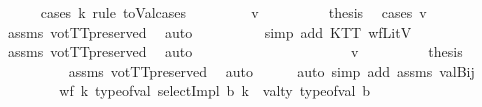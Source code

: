 \begin{isabellebody}
\ \ \ \ \isamarkupfalse%
\ {\isacharparenleft}{\kern0pt}cases\ k\ rule{\isacharcolon}{\kern0pt}\ toVal{}{}{}{}{\isachardot}{\kern0pt}cases{\isacharparenright}{\kern0pt}\isanewline
\ \ \ \ \ \ \isamarkupfalse%
\ {\isacharparenleft}{\kern0pt}{}\ v{\isacharparenright}{\kern0pt}\isanewline
\ \ \ \ \ \ \isamarkupfalse%
\ \isamarkupfalse%
\ {\isacharquery}{\kern0pt}thesis\ \isamarkupfalse%
\ {\isacharparenleft}{\kern0pt}cases\ v{\isacharparenright}{\kern0pt}\isanewline
\ \ \ \ \ \ \ \ \isamarkupfalse%
\ assms{\isacharparenleft}{\kern0pt}{}{\isacharparenright}{\kern0pt}\ votTTpreserved\ \isamarkupfalse%
\ auto{\isacharbrackleft}{\kern0pt}{}{\isacharbrackright}{\kern0pt}\isanewline
\ \ \ \ \ \ \ \ \isamarkupfalse%
\ {\isacharparenleft}{\kern0pt}simp\ add{\isacharcolon}{\kern0pt}\ KTT\ wfLitV{\isacharparenright}{\kern0pt}\isanewline
\ \ \ \ \ \ \ \ \isamarkupfalse%
\ assms{\isacharparenleft}{\kern0pt}{}{\isacharparenright}{\kern0pt}\ votTTpreserved\ \isamarkupfalse%
\ auto\isanewline
\ \ \ \ \ \ \ \ \isamarkupfalse%
\isanewline
\ \ \ \ \isamarkupfalse%
\isanewline
\ \ \ \ \ \ \isamarkupfalse%
\ {\isacharparenleft}{\kern0pt}{}\ v{\isacharparenright}{\kern0pt}\isanewline
\ \ \ \ \ \ \isamarkupfalse%
\ \isamarkupfalse%
\ {\isacharquery}{\kern0pt}thesis\isanewline
\ \ \ \ \ \ \ \ \isamarkupfalse%
\ assms{\isacharparenleft}{\kern0pt}{}{\isacharparenright}{\kern0pt}\ votTTpreserved\ \isamarkupfalse%
\ auto\isanewline
\ \ \ \ \isamarkupfalse%
\ {\isacharparenleft}{\kern0pt}auto\ simp\ add{\isacharcolon}{\kern0pt}\ assms\ valBij{}{\isacharparenright}{\kern0pt}\isanewline
\ \ \isamarkupfalse%
\isanewline
\ \ \ \ \isanewline
\ \ \isamarkupfalse%
\ wf{}{\isacharcolon}{\kern0pt}\ {\isachardoublequoteopen}{\isasymforall}k{\isachardot}{\kern0pt}\ type{\isacharunderscore}{\kern0pt}of{\isacharunderscore}{\kern0pt}val\ {\isacharparenleft}{\kern0pt}selectImpl\ b\ k{\isacharparenright}{\kern0pt}\ {\isacharequal}{\kern0pt}\ val{\isacharunderscore}{\kern0pt}ty\ {\isacharparenleft}{\kern0pt}type{\isacharunderscore}{\kern0pt}of{\isacharunderscore}{\kern0pt}val\ b{\isacharparenright}{\kern0pt}{\isachardoublequoteclose}\isanewline

\end{isabellebody}
